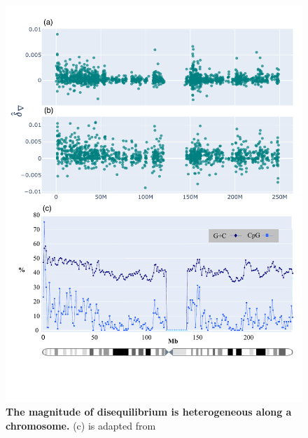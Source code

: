 \begin{figure}[htbp]
\centering
\includegraphics[width=	\textwidth]{figures/plots/primate/nabla_CpG_appendix.pdf}
\caption{\textbf{The magnitude of disequilibrium is heterogeneous along a chromosome.} (c) is adapted from \citep{Gregory2006TheChromosome1}}
\label{fig:primate:dconv-manhattan-appendix}
\end{figure}
